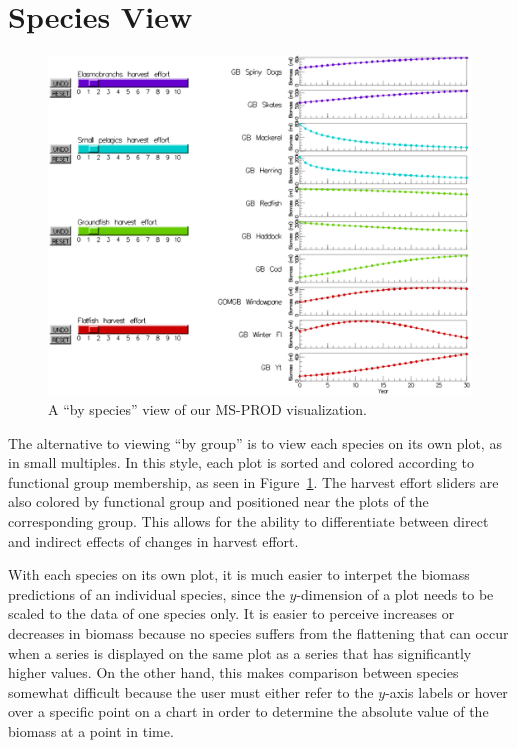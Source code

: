 \section{Species View}

\begin{figure}[h]
	\centering
	\includegraphics[width=13cm]{figures/eps/msprod_species.eps}
	\caption{A ``by species'' view of our MS-PROD visualization.}
	\label{fig:msprod_species}
\end{figure}

The alternative to viewing ``by group'' is to view each species on its own plot, as in small multiples.  In this style, each plot is sorted and colored according to functional group membership, as seen in Figure~\ref{fig:msprod_species}.  The harvest effort sliders are also colored by functional group and positioned near the plots of the corresponding group.  This allows for the ability to differentiate between direct and indirect effects of changes in harvest effort.

With each species on its own plot, it is much easier to interpet the biomass predictions of an individual species, since the $y$-dimension of a plot needs to be scaled to the data of one species only.  It is easier to perceive increases or decreases in biomass because no species suffers from the flattening that can occur when a series is displayed on the same plot as a series that has significantly higher values.  On the other hand, this makes comparison between species somewhat difficult because the user must either refer to the $y$-axis labels or hover over a specific point on a chart in order to determine the absolute value of the biomass at a point in time.

